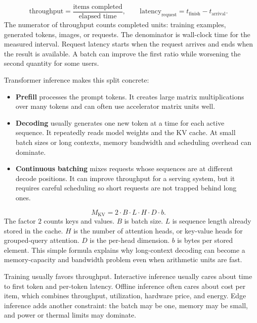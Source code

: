 \begin{keyequation}
\[
  \text{throughput} =
  \frac{\text{items completed}}{\text{elapsed time}},
  \qquad
  \text{latency}_{\text{request}} =
  t_{\text{finish}} - t_{\text{arrival}}.
\]
\tcblower
The numerator of throughput counts completed units: training examples, generated tokens, images, or requests. The denominator is wall-clock time for the measured interval. Request latency starts when the request arrives and ends when the result is available. A batch can improve the first ratio while worsening the second quantity for some users.
\end{keyequation}

Transformer inference makes this split concrete:

\begin{itemize}[leftmargin=*]
  \item \textbf{Prefill} processes the prompt tokens. It creates large matrix multiplications over many tokens and can often use accelerator matrix units well.
  \item \textbf{Decoding} usually generates one new token at a time for each active sequence. It repeatedly reads model weights and the KV cache. At small batch sizes or long contexts, memory bandwidth and scheduling overhead can dominate.
  \item \textbf{Continuous batching} mixes requests whose sequences are at different decode positions. It can improve throughput for a serving system, but it requires careful scheduling so short requests are not trapped behind long ones.
\end{itemize}

\begin{keyequation}
\[
  M_{\text{KV}} =
  2 \cdot B \cdot L \cdot H \cdot D \cdot b.
\]
\tcblower
The factor \(2\) counts keys and values. \(B\) is batch size. \(L\) is sequence length already stored in the cache. \(H\) is the number of attention heads, or key-value heads for grouped-query attention. \(D\) is the per-head dimension. \(b\) is bytes per stored element. This simple formula explains why long-context decoding can become a memory-capacity and bandwidth problem even when arithmetic units are fast.
\end{keyequation}

Training usually favors throughput. Interactive inference usually cares about time to first token and per-token latency. Offline inference often cares about cost per item, which combines throughput, utilization, hardware price, and energy. Edge inference adds another constraint: the batch may be one, memory may be small, and power or thermal limits may dominate.

